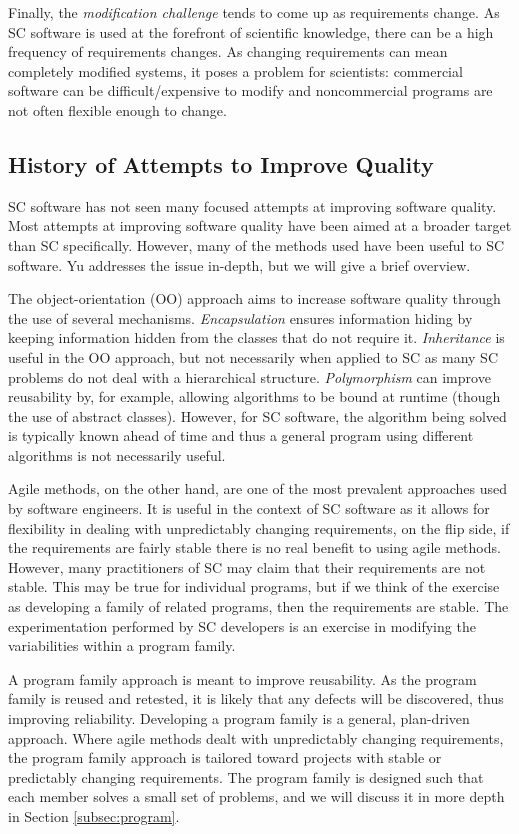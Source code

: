 \documentclass[10pt, preprint]{sigplanconf}
\begin{document}
Finally, the \textit{modification challenge} tends to come up as requirements
change. As SC software is used at the forefront of scientific knowledge, there
can be a high frequency of requirements changes. As changing requirements can
mean completely modified systems, it poses a problem for scientists: commercial
software can be difficult/expensive to modify and noncommercial programs are not
often flexible enough to change.

\subsection{History of Attempts to Improve Quality} \label{subsec:history}

SC software has not seen many focused attempts at improving software
quality. Most attempts at improving software quality have been aimed at a
broader target than SC specifically. However, many of the methods used have been
useful to SC software. Yu \cite{Yu2011} addresses the issue in-depth, but we
will give a brief overview.

The object-orientation (OO) approach aims to increase software quality through
the use of several mechanisms. \textit{Encapsulation} ensures information hiding
\cite{Parnas1972} by keeping information hidden from the classes that do not
require it. \textit{Inheritance} is useful in the OO approach, but not
necessarily when applied to SC as many SC problems do not deal with a
hierarchical structure. \textit{Polymorphism} can improve reusability by, for
example, allowing algorithms to be bound at runtime (though the use of abstract
classes). However, for SC software, the algorithm being solved is typically
known ahead of time and thus a general program using different algorithms is not
necessarily useful.

Agile methods, on the other hand, are one of the most prevalent approaches used
by software engineers. It is useful in the context of SC software as it allows
for flexibility in dealing with unpredictably changing requirements, on the flip
side, if the requirements are fairly stable there is no real benefit to using
agile methods.  However, many practitioners of SC may claim that their
requirements are not stable. This may be true for individual programs, but if
we think of the exercise as developing a family of related programs, then the
requirements are stable. The experimentation performed by SC developers is
an exercise in modifying the variabilities within a program family.

A program family approach is meant to improve reusability. As the program family
is reused and retested, it is likely that any defects will be discovered, thus
improving reliability. Developing a program family is a general, plan-driven
approach. Where agile methods dealt with unpredictably changing requirements,
the program family approach is tailored toward projects with stable or
predictably changing requirements. The program family is designed such that each
member solves a small set of problems, and we will discuss it in more depth in
Section \ref{subsec:program}. %
\end{document}
